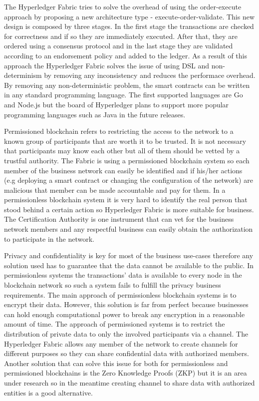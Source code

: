 The Hyperledger Fabric tries to solve the overhead of using the order-execute approach by proposing a new architecture type - execute-order-validate. This new design is composed by three stages. In the first stage the transactions are checked for correctness and if so they are immediately executed. After that, they are ordered using a consensus protocol and in the last stage they are validated according to an endorsement policy and added to the ledger. As a result of this approach the Hyperledger Fabric solves the issue of using DSL and non-determinism by removing any inconsistency and reduces the performace overhead. By removing any non-deterministic problem, the smart contracts can be written in any standard programming language. The first supported languages are Go and Node.js but the board of Hyperledger plans to support more popular programming languages such as Java in the future releases.

Permissioned blockchain refers to restricting the access to the network to a known group of participants that are worth it to be trusted. It is not necessary that participants may know each other but all of them should be vetted by a trustful authority. The Fabric is using a permissioned blockchain system so each member of the business network can easily be identified and if his/her actions (e.g deploying a smart contract or changing the configuration of the network) are malicious that member can be made accountable and pay for them. In a permissionless blockchain system it is very hard to identify the real person that stood behind a certain action so Hyperledger Fabric is more suitable for business. The Certification Authority is one instrument that can vet for the business network members and any respectful business can easily obtain the authorization to participate in the network.

Privacy and confidentiality is key for most of the business use-cases therefore any solution used has to guarantee that the data cannot be available to the public. 
In permissionless systems the transactions' data is available to every node in the blockchain network so such a system fails to fulfill the privacy business requirements. The main approach of permissionless blockchain systems is to encrypt their data. However, this solution is far from perfect because businesses can hold enough computational power to break any encryption in a reasonable amount of time.
The approach of permissioned systems is to restrict the distribution of private data to only the involved participants via a channel. The Hyperledger Fabric allows any member of the network to create channels for different purposes so they can share confidential data with authorized members.
Another solution that can solve this issue for both for permissionless and permissioned blockchains is the Zero Knowledge Proofs (ZKP) but it is an area under research so in the meantime creating channel to share data with authorized entities is a good alternative.  

